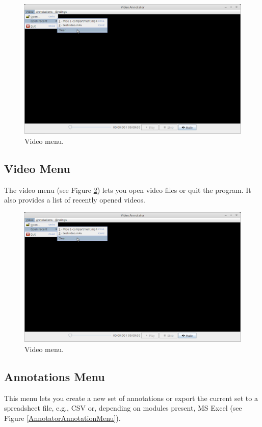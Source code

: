 \documentclass[a4paper]{book}
\begin{document}
\begin{figure}[htb]
  \centering
  \includegraphics[width=12.0cm]{images/AnnotatorVideoMenu.png}
  \caption{Video menu.}
  \label{AnnotatorVideoMenu}
\end{figure}

\subsection{Video Menu}
The video menu (see Figure \ref{AnnotatorVideoMenu}) lets you open video
files or quit the program. It also provides a list of recently opened videos.

\begin{figure}[htb]
  \centering
  \includegraphics[width=12.0cm]{images/AnnotatorVideoMenu.png}
  \caption{Video menu.}
  \label{AnnotatorVideoMenu}
\end{figure}

\subsection{Annotations Menu}
This menu lets you create a new set of annotations or export the current
set to a spreadsheet file, e.g., CSV or, depending on modules present,
MS Excel (see Figure \ref{AnnotatorAnnotationMenu}).
\end{document}
